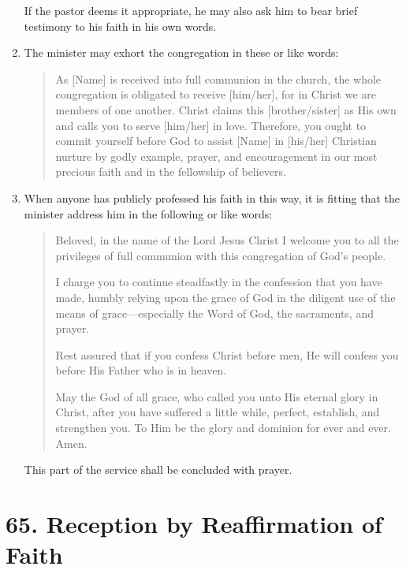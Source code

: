 \documentclass[
]{book}
\begin{document}
\begin{enumerate}
  If the pastor deems it appropriate, he may also ask him to bear brief testimony to his faith in his own words.
\item
  The minister may exhort the congregation in these or like words:

  \begin{quote}
  As {[}Name{]} is received into full communion in the church, the whole congregation is obligated to receive {[}him/her{]}, for in Christ we are members of one another. Christ claims this {[}brother/sister{]} as His own and calls you to serve {[}him/her{]} in love. Therefore, you ought to commit yourself before God to assist {[}Name{]} in {[}his/her{]} Christian nurture by godly example, prayer, and encouragement in our most precious faith and in the fellowship of believers.
  \end{quote}
\item
  \protect\hypertarget{64.4}{\href{}{}}When anyone has publicly professed his faith in this way, it is fitting that the minister address him in the following or like words:

  \begin{quote}
  Beloved, in the name of the Lord Jesus Christ I welcome you to all the privileges of full communion with this congregation of God's people.

  I charge you to continue steadfastly in the confession that you have made, humbly relying upon the grace of God in the diligent use of the means of grace---especially the Word of God, the sacraments, and prayer.

  Rest assured that if you confess Christ before men, He will confess you before His Father who is in heaven.

  May the God of all grace, who called you unto His eternal glory in Christ, after you have suffered a little while, perfect, establish, and strengthen you. To Him be the glory and dominion for ever and ever. Amen.
  \end{quote}

  This part of the service shall be concluded with prayer.
\end{enumerate}

\hypertarget{reception-by-reaffirmation-of-faith}{%
\section*{65. Reception by Reaffirmation of Faith}\label{reception-by-reaffirmation-of-faith}}
\end{document}
